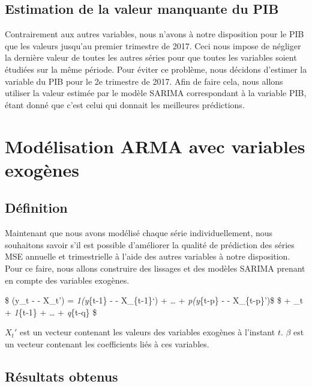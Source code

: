 \documentclass[11pt,]{article}
\newenvironment{Shaded}{\begin{snugshade}}{\end{snugshade}}
\newcommand{\KeywordTok}[1]{\textcolor[rgb]{0.13,0.29,0.53}{\textbf{#1}}}
\newcommand{\DataTypeTok}[1]{\textcolor[rgb]{0.13,0.29,0.53}{#1}}
\newcommand{\DecValTok}[1]{\textcolor[rgb]{0.00,0.00,0.81}{#1}}
\newcommand{\StringTok}[1]{\textcolor[rgb]{0.31,0.60,0.02}{#1}}
\newcommand{\OperatorTok}[1]{\textcolor[rgb]{0.81,0.36,0.00}{\textbf{#1}}}
\newcommand{\NormalTok}[1]{#1}
\begin{document}
\subsection{Estimation de la valeur manquante du
PIB}\label{estimation-de-la-valeur-manquante-du-pib}

Contrairement aux autres variables, nous n'avons à notre disposition
pour le PIB que les valeurs jusqu'au premier trimestre de 2017. Ceci
nous impose de négliger la dernière valeur de toutes les autres séries
pour que toutes les variables soient étudiées sur la même période. Pour
éviter ce problème, nous décidons d'estimer la variable du PIB pour le
2e trimestre de 2017. Afin de faire cela, nous allons utiliser la valeur
estimée par le modèle SARIMA correspondant à la variable PIB, étant
donné que c'est celui qui donnait les meilleures prédictions.

\begin{Shaded}
\end{Shaded}

\section{Modélisation ARMA avec variables
exogènes}\label{modelisation-arma-avec-variables-exogenes}

\subsection{Définition}\label{definition-2}

Maintenant que nous avons modélisé chaque série individuellement, nous
souhaitons savoir s'il est possible d'améliorer la qualité de prédiction
des séries MSE annuelle et trimestrielle à l'aide des autres variables à
notre disposition. Pour ce faire, nous allons construire des lissages et
des modèles SARIMA prenant en compte des variables exogènes.

\$ (y\_t - \mu - X\_t'\beta) = \phi\emph{1(y}\{t-1\} - \mu -
X\_\{t-1\}`\beta) + \ldots{} + \phi\emph{p(y}\{t-p\} - \mu -
X\_\{t-p\}')\$ \$ + \epsilon\_t + \theta\emph{1\epsilon}\{t-1\} +
\ldots{} + \theta\emph{q\epsilon}\{t-q\} \$

\(X_t'\) est un vecteur contenant les valeurs des variables exogènes à
l'instant \(t\). \(\beta\) est un vecteur contenant les coefficients
liés à ces variables.

\subsection{Résultats obtenus}\label{resultats-obtenus-2}
\end{document}
